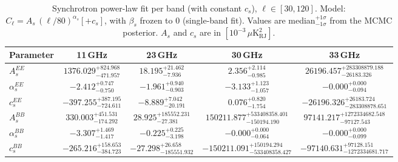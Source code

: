 \begin{table}[htbp]
\centering
\caption{Synchrotron power-law fit per band (with constant $c_s$), $\ell \in [30, 120]$. Model: $C_\ell = A_s\,(\ell/80)^{\alpha_s} [+ c_s]$, with $\beta_s$ frozen to 0 (single-band fit). Values are median$^{+1\sigma}_{-1\sigma}$ from the MCMC posterior. $A_s$ and $c_s$ are in $[10^{-3}\,\mu\mathrm{K}^2_\mathrm{RJ}]$.}
\label{tab:sync_single_band_withc_ell30-120}
\begin{tabular}{lcccc}
\toprule
Parameter & 11\,GHz & 23\,GHz & 30\,GHz & 33\,GHz \\
\midrule
$A_s^{EE}$ & $1376.029^{+824.968}_{-471.957}$ & $18.195^{+21.462}_{-7.936}$ & $2.356^{+2.114}_{-0.985}$ & $26196.457^{+283308879.188}_{-26183.326}$ \\
$\alpha_s^{EE}$ & $-2.412^{+0.747}_{-0.750}$ & $-1.961^{+0.940}_{-0.903}$ & $-3.133^{+1.123}_{-1.057}$ & $-0.000^{+0.000}_{-0.094}$ \\
$c_s^{EE}$ & $-397.255^{+387.195}_{-724.611}$ & $-8.889^{+7.042}_{-20.191}$ & $0.076^{+0.820}_{-1.754}$ & $-26196.326^{+26183.724}_{-283308878.651}$ \\
\midrule
$A_s^{BB}$ & $330.003^{+451.531}_{-174.292}$ & $28.925^{+185552.231}_{-27.381}$ & $150211.877^{+533408358.401}_{-150194.190}$ & $97141.217^{+1272334682.548}_{-97127.543}$ \\
$\alpha_s^{BB}$ & $-3.307^{+1.469}_{-1.417}$ & $-0.225^{+0.225}_{-3.198}$ & $-0.000^{+0.000}_{-0.064}$ & $-0.000^{+0.000}_{-0.099}$ \\
$c_s^{BB}$ & $-265.216^{+158.653}_{-384.723}$ & $-27.298^{+26.658}_{-185551.932}$ & $-150211.091^{+150194.294}_{-533408358.427}$ & $-97140.631^{+97128.151}_{-1272334681.717}$ \\
\bottomrule
\end{tabular}
\end{table}